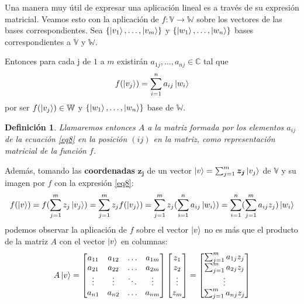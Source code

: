 \documentclass[a4paper]{article}
\newtheorem{deff}{Definición}[section]
\numberwithin{equation}{section}
\begin{document}
Una manera muy útil de expresar una aplicación lineal es a través de su expresión matricial. Veamos esto con la aplicación de $f:\mathbb{V} \longrightarrow \mathbb{W}$ sobre los vectores de las bases correspondientes. Sea $\{ \ket{v_1}, \ldots, \ket{v_m} \}$ y $\{ \ket{w_1}, \ldots, \ket{w_n} \}$ bases correspondientes a $\mathbb{V}$ y $\mathbb{W}$.

Entonces para cada j de $1$ a $m$ existirán $a_{1j}, \ldots, a_{nj} \in \mathbb{C}$ tal que
\begin{equation} \label{eq8}
f(\ket{v_j}) = \sum_{i=1}^n a_{ij} \ket{w_i}
\end{equation}
por ser $f(\ket{v_j}) \in \mathbb{W}$ y $\{ \ket{w_1}, \ldots, \ket{w_n} \}$ base de $\mathbb{W}$.

\begin{deff}Llamaremos entonces $A$ a la matriz formada por los elementos $a_{ij}$ de la ecuación \ref{eq8} en la posición $(ij)$ en la matriz, como representación matricial de la función $f$.
\end{deff}

Además, tomando las \textbf{coordenadas} $\boldsymbol{z_j}$ de un vector $\ket{v} = \sum_{j=1}^m \boldsymbol{z_j} \ket{v_j}$ de $\mathbb{V}$ y su imagen por $f$ con la expresión \ref{eq8}:
\begin{equation}
f(\ket{v}) = f(\sum_{j=1}^m z_j \ket{v_j}) = \sum_{j=1}^m z_j f(\ket{v_j}) = \sum_{j=1}^m z_j (\sum_{i=1}^n a_{ij} \ket{w_i}) = 
\sum_{i=1}^n (\sum_{j=1}^m a_{ij} z_{j}) \ket{w_i}
\end{equation}
podemos observar la aplicación de $f$ sobre el vector $\ket{v}$ no es más que el producto de la matriz $A$ con el vector $\ket{v}$ en columnas:
\begin{equation}
A\ket{v} = 
\begin{bmatrix}
a_{11} & a_{12} &\ldots & a_{1m} \\
a_{21} & a_{22} &\ldots & a_{2m} \\
\vdots & \vdots &\ddots & \vdots \\
a_{n1} & a_{n2} &\ldots & a_{nm}
\end{bmatrix}
\begin{bmatrix}
z_1 \\ z_2 \\ \vdots \\ z_m
\end{bmatrix} =
\begin{bmatrix}
\sum_{j=1}^m a_{1j}z_j \\
\sum_{j=1}^m a_{2j}z_j \\
\vdots \\
\sum_{j=1}^m a_{nj}z_j \\
\end{bmatrix}
\end{equation}
\end{document}
